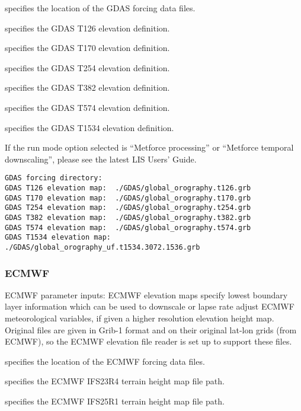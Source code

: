   specifies the location of the GDAS
 forcing data files.

  specifies the GDAS T126 elevation
 definition.

  specifies the GDAS T170 elevation
 definition.

  specifies the GDAS T254 elevation
 definition.

  specifies the GDAS T382 elevation
 definition.

  specifies the GDAS T574 elevation
 definition.

  specifies the GDAS T1534 elevation
 definition.

 If the run mode option selected is ``Metforce processing'' or
 ``Metforce temporal downscaling'', please see the latest LIS Users'
 Guide.

 

 \begin{Verbatim}[frame=single]
GDAS forcing directory:
GDAS T126 elevation map:  ./GDAS/global_orography.t126.grb
GDAS T170 elevation map:  ./GDAS/global_orography.t170.grb
GDAS T254 elevation map:  ./GDAS/global_orography.t254.grb
GDAS T382 elevation map:  ./GDAS/global_orography.t382.grb
GDAS T574 elevation map:  ./GDAS/global_orography.t574.grb
GDAS T1534 elevation map: ./GDAS/global_orography_uf.t1534.3072.1536.grb
 \end{Verbatim}

 
 \subsubsection{ECMWF} \label{sssec:forcings_ecmwf}
 ECMWF parameter inputs:  ECMWF elevation maps specify lowest
 boundary layer information which can be used to downscale or
 lapse rate adjust ECMWF meteorological variables, if given a higher 
 resolution elevation height map. Original files are given in
 Grib-1 format and on their original lat-lon grids (from ECMWF), 
 so the ECMWF elevation file reader is set up to support these files.

  specifies the location of the
 ECMWF forcing data files.

  specifies the ECMWF IFS23R4 
 terrain height map file path.

  specifies the ECMWF IFS25R1
 terrain height map file path.


